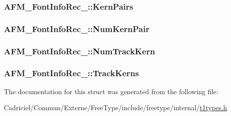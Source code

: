 \hypertarget{struct_a_f_m___font_info_rec___a16c5da5249d4d4f68cc169469f3ee75a}{
\subsubsection[{Kern\-Pairs}]{ A\-F\-M\-\_\-\-Font\-Info\-Rec\-\_\-\-::\-Kern\-Pairs}}\label{struct_a_f_m___font_info_rec___a16c5da5249d4d4f68cc169469f3ee75a}
\hypertarget{struct_a_f_m___font_info_rec___a8ff8af3c83fbf0b060bb711b57f1affd}{
\subsubsection[{Num\-Kern\-Pair}]{ A\-F\-M\-\_\-\-Font\-Info\-Rec\-\_\-\-::\-Num\-Kern\-Pair}}\label{struct_a_f_m___font_info_rec___a8ff8af3c83fbf0b060bb711b57f1affd}
\hypertarget{struct_a_f_m___font_info_rec___a08a9207e8d4b0dd9dc0313218462f00e}{
\subsubsection[{Num\-Track\-Kern}]{ A\-F\-M\-\_\-\-Font\-Info\-Rec\-\_\-\-::\-Num\-Track\-Kern}}\label{struct_a_f_m___font_info_rec___a08a9207e8d4b0dd9dc0313218462f00e}
\hypertarget{struct_a_f_m___font_info_rec___a8d9305229a1dacc15b8fceb5dbf25b9d}{
\subsubsection[{Track\-Kerns}]{ A\-F\-M\-\_\-\-Font\-Info\-Rec\-\_\-\-::\-Track\-Kerns}}\label{struct_a_f_m___font_info_rec___a8d9305229a1dacc15b8fceb5dbf25b9d}


The documentation for this struct was generated from the following file\-:\begin{DoxyCompactItemize}
\item 
Cadriciel/\-Commun/\-Externe/\-Free\-Type/include/freetype/internal/\hyperlink{t1types_8h}{t1types.\-h}\end{DoxyCompactItemize}
